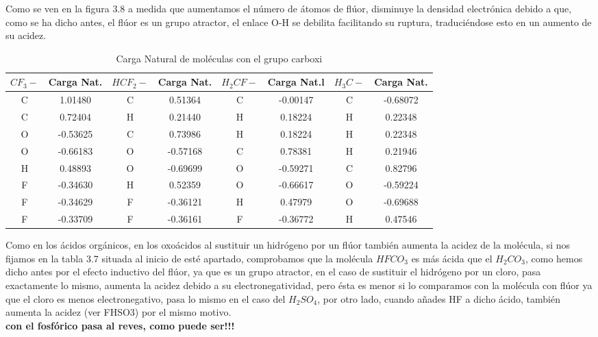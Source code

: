 Como se ven en la figura 3.8 a medida que aumentamos el número de átomos de flúor, disminuye la densidad electrónica debido a que, como se ha dicho antes, el flúor es un grupo atractor, el enlace O-H se debilita facilitando su ruptura, traduciéndose esto en un aumento de su acidez.
\begin{table}[H]
    \centering
    \begin{tabular}{|c|c|c|c|c|c|c|c|}
    \hline
    $CF_3-$ & Carga Nat. & $HCF_2-$ & Carga Nat. & $H_2CF-$ & Carga Nat.l  & $H_3C-$ & Carga Nat. \\ \hline
     C & 1.01480 &  C & 0.51364 & C & -0.00147 & C & -0.68072 \\ \hline
     C & 0.72404 &  H & 0.21440 & H & 0.18224 & H & 0.22348 \\ \hline
     O & -0.53625 & C & 0.73986 & H & 0.18224 & H & 0.22348 \\ \hline
     O & -0.66183 & O & -0.57168 & C & 0.78381 & H & 0.21946 \\ \hline
     H & 0.48893 & O & -0.69699 & O & -0.59271 & C & 0.82796 \\ \hline
     F & -0.34630 & H & 0.52359 & O & -0.66617 & O & -0.59224 \\ \hline
     F & -0.34629 & F & -0.36121 & H & 0.47979 & O & -0.69688 \\ \hline
     F & -0.33709 & F & -0.36161 & F & -0.36772 & H & 0.47546 \\ \hline
    \end{tabular}
    \caption{Carga Natural de moléculas con el grupo carboxi}
\end{table}

Como en los ácidos orgánicos, en los oxoácidos al sustituir un hidrógeno por un flúor también aumenta la acidez de la molécula, si nos fijamos en la tabla 3.7 situada al inicio de esté apartado, comprobamos que la molécula $HFCO_3$ es más ácida que el $H_2CO_3$, como hemos dicho antes por el efecto inductivo del flúor, ya que es un grupo atractor, en el caso de sustituir el hidrógeno por un cloro, pasa exactamente lo mismo, aumenta la acidez debido a su electronegatividad, pero ésta es menor si lo comparamos con la molécula con flúor ya que el cloro es menos electronegativo, pasa lo mismo en el caso del $H_2SO_4$, por otro lado, cuando añades HF a dicho ácido, también aumenta la acidez (ver FHSO3) por el mismo motivo.\\
{\bfseries con el fosfórico pasa al reves, como puede ser!!! }


